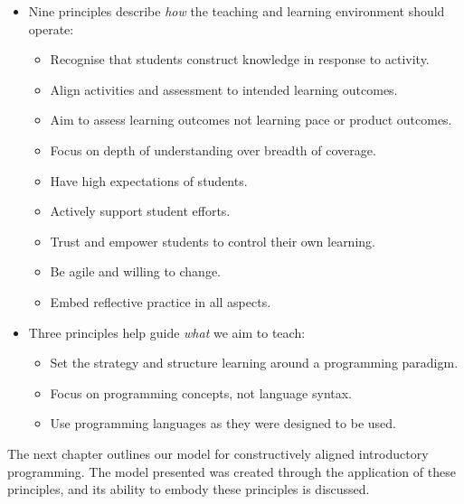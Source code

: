 \begin{itemize}
	\item Nine principles describe \emph{how} the teaching and learning environment should operate:
	\begin{itemize}
		\item Recognise that students construct knowledge in response to activity.
		\item Align activities and assessment to intended learning outcomes.
		\item Aim to assess learning outcomes not learning pace or product outcomes.
		\item Focus on depth of understanding over breadth of coverage.
		\item Have high expectations of students.
		\item Actively support student efforts.
		\item Trust and empower students to control their own learning.
		\item Be agile and willing to change.
		\item Embed reflective practice in all aspects.
	\end{itemize}
	\item Three principles help guide \emph{what} we aim to teach:
	\begin{itemize}
		\item Set the strategy and structure learning around a programming paradigm.
		\item Focus on programming concepts, not language syntax.
		\item Use programming languages as they were designed to be used.
	\end{itemize}
\end{itemize}

The next chapter outlines our model for constructively aligned introductory programming. The model presented was created through the application of these principles, and its ability to embody these principles is discussed.



